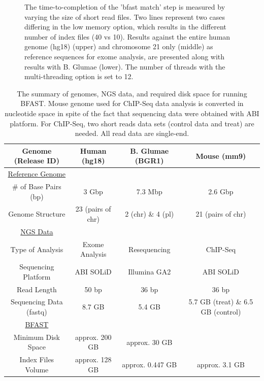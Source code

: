 \documentclass{cpeauth}
\begin{document}
\begin{figure}
\caption{\small The time-to-completion of the 'bfast match' step is
  measured by varying the size of short read files.  Two lines
  represent two cases differing in the low memory option, which
  results in the different number of index files (40 vs 10).  Results against the entire human genome (hg18) (upper) and chromosome 21 only (middle) as reference sequences for exome analysis, are presented along with results with B. Glumae (lower).  The number of threads with the multi-threading option is set to 12.}
  \label{fig:parallel-execution} 
 \end{figure}




\begin{table}
\small
\begin{tabular}{|c|c|c|c|} 
  \hline 
Genome (Release ID)   & Human (hg18) & B. Glumae (BGR1) & Mouse (mm9)  \\    
   
\hline \hline
\underline{Reference Genome} & & & \\
    \# of Base Pairs (bp) &  3 Gbp & 7.3 Mbp & 2.6 Gbp\\ 
   Genome Structure &   23 (pairs of chr)  & 2 (chr) \& 4 (pl) & 21 (pairs of chr)   \\   
 
      \hline \hline
  \underline{NGS Data} & &   & \\
      Type of  Analysis &  Exome Analysis &  Resequencing & ChIP-Seq\\ 
  
          Sequencing Platform & ABI SOLiD  &  Illumina GA2 & ABI SOLiD \\ 
          Read Length & 50 bp & 36 bp & 36 bp \\

  Sequencing Data (fastq)  & 8.7 GB & 5.4 GB & 5.7 GB (treat) \& 6.5 GB (control) \\
  
  
  \hline  \hline
  \underline{BFAST} & &  & \\
  Minimum Disk Space &  approx. 200 GB   &    approx. 30 GB  &  \\
   Index Files Volume  & approx. 128 GB  & approx. 0.447 GB  & approx. 3.1 GB\\ 
\hline  \hline
\end{tabular} \caption{The summary of genomes, NGS data, and required disk space for running BFAST.  Mouse genome used for ChIP-Seq data analysis is converted in nucleotide space in spite of the fact that sequencing data were obtained with ABI platform.  For ChIP-Seq, two short reads data sets (control data and treat) are needed.  All read data are single-end.}
 \label{table:two-genomes} 
\end{table}
\end{document}
